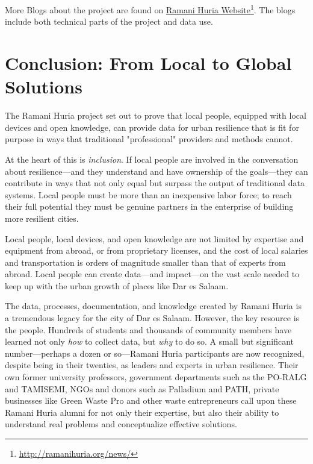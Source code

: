 \documentclass[a4paper,12pt,twoside]{article}
\begin{document}
More Blogs about the project are found on \href{http://ramanihuria.org/news/}{Ramani Huria Website}\footnote{\url{http://ramanihuria.org/news/}}. The blogs include both technical parts of the project and data use.

\newpage
\section{Conclusion: From Local to Global Solutions}
\begin{multicols}{2}

The Ramani Huria project set out to prove that local people, equipped with local devices and open knowledge, can provide data for urban resilience that is fit for purpose in ways that traditional "professional" providers and methods cannot. 

At the heart of this is \textit{inclusion}. If local people are involved in the conversation about resilience---and they understand and have ownership of the goals---they can contribute in ways that not only equal but surpass the output of traditional data systems. Local people must be more than an inexpensive labor force; to reach their full potential they must be genuine partners in the enterprise of building more resilient cities.

Local people, local devices, and open knowledge are not limited by expertise and equipment from abroad, or from proprietary licenses, and the cost of local salaries and transportation is orders of magnitude smaller than that of experts from abroad. Local people can create data---and impact---on the vast scale needed to keep up with the urban growth of places like Dar es Salaam.

The data, processes, documentation, and knowledge created by Ramani Huria is a tremendous legacy for the city of Dar es Salaam. However, the key resource is the people. Hundreds of students and thousands of community members have learned not only \textit{how} to collect data, but \textit{why} to do so. A small but significant number---perhaps a dozen or so---Ramani Huria participants are now recognized, despite being in their twenties, as leaders and experts in urban resilience. Their own former university professors, government departments such as the PO-RALG and TAMISEMI, NGOs and donors such as Palladium and PATH, private businesses like Green Waste Pro and other waste entrepreneurs call upon these Ramani Huria alumni for not only their expertise, but also their ability to understand real problems and conceptualize effective solutions. 


\end{multicols}
\end{document}
